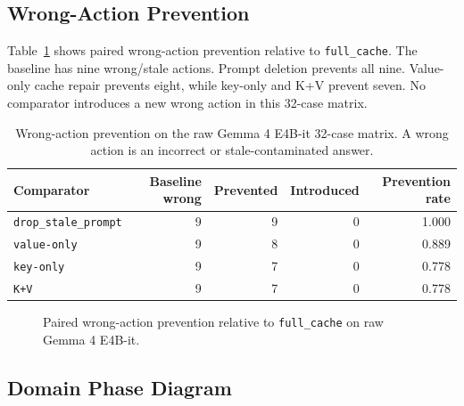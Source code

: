 \documentclass[11pt]{article}
\newcommand{\fullcache}{\texttt{full\_cache}}
\newcommand{\promptdelete}{\texttt{drop\_stale\_prompt}}
\newcommand{\valueedit}{\texttt{value-only}}
\newcommand{\keyedit}{\texttt{key-only}}
\newcommand{\kvedit}{\texttt{K+V}}
\newcommand{\gemma}{Gemma 4 E4B-it}
\begin{document}
\subsection{Wrong-Action Prevention}

Table~\ref{tab:wrong-action} shows paired wrong-action prevention relative to
\fullcache. The baseline has nine wrong/stale actions. Prompt deletion prevents
all nine. Value-only cache repair prevents eight, while key-only and K+V
prevent seven. No comparator introduces a new wrong action in this 32-case
matrix.

\begin{table}[H]
\centering
\small
\begin{tabular}{lrrrr}
\toprule
\textbf{Comparator} & \textbf{Baseline wrong} & \textbf{Prevented} & \textbf{Introduced} & \textbf{Prevention rate} \\
\midrule
\promptdelete & 9 & 9 & 0 & 1.000 \\
\valueedit & 9 & 8 & 0 & 0.889 \\
\keyedit & 9 & 7 & 0 & 0.778 \\
\kvedit & 9 & 7 & 0 & 0.778 \\
\bottomrule
\end{tabular}
\caption{Wrong-action prevention on the raw \gemma{} 32-case matrix. A wrong
action is an incorrect or stale-contaminated answer.}
\label{tab:wrong-action}
\end{table}

\begin{figure}[H]
\centering
{}
\caption{Paired wrong-action prevention relative to \fullcache{} on raw
\gemma{}.}
\label{fig:wrong-actions}
\end{figure}

\subsection{Domain Phase Diagram}
\end{document}
